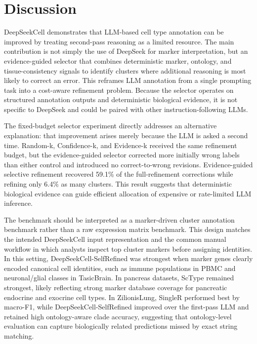 \documentclass[referee,lineno,pdflatex]{sn-jnl}
\begin{document}
\section{Discussion}\label{sec:discussion}

DeepSeekCell demonstrates that LLM-based cell type annotation can be improved by treating second-pass reasoning as a limited resource. The main contribution is not simply the use of DeepSeek for marker interpretation, but an evidence-guided selector that combines deterministic marker, ontology, and tissue-consistency signals to identify clusters where additional reasoning is most likely to correct an error. This reframes LLM annotation from a single prompting task into a cost-aware refinement problem. Because the selector operates on structured annotation outputs and deterministic biological evidence, it is not specific to DeepSeek and could be paired with other instruction-following LLMs.

The fixed-budget selector experiment directly addresses an alternative explanation: that improvement arises merely because the LLM is asked a second time. Random-k, Confidence-k, and Evidence-k received the same refinement budget, but the evidence-guided selector corrected more initially wrong labels than either control and introduced no correct-to-wrong revisions. Evidence-guided selective refinement recovered 59.1\% of the full-refinement corrections while refining only 6.4\% as many clusters. This result suggests that deterministic biological evidence can guide efficient allocation of expensive or rate-limited LLM inference.

The benchmark should be interpreted as a marker-driven cluster annotation benchmark rather than a raw expression matrix benchmark. This design matches the intended DeepSeekCell input representation and the common manual workflow in which analysts inspect top cluster markers before assigning identities. In this setting, DeepSeekCell-SelfRefined was strongest when marker genes clearly encoded canonical cell identities, such as immune populations in PBMC and neuronal/glial classes in TasicBrain. In pancreas datasets, ScType remained strongest, likely reflecting strong marker database coverage for pancreatic endocrine and exocrine cell types. In ZilionisLung, SingleR performed best by macro-F1, while DeepSeekCell-SelfRefined improved over the first-pass LLM and retained high ontology-aware clade accuracy, suggesting that ontology-level evaluation can capture biologically related predictions missed by exact string matching.
\end{document}

